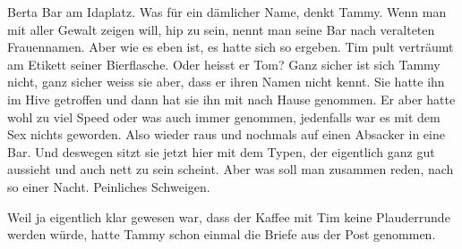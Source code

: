 Berta Bar am Idaplatz. Was für ein dämlicher Name, denkt Tammy. Wenn man mit aller Gewalt zeigen will, hip zu sein, nennt man seine Bar nach veralteten Frauennamen. Aber wie es eben ist, es hatte sich so ergeben. Tim pult verträumt am Etikett seiner Bierflasche. Oder heisst er Tom? Ganz sicher ist sich Tammy nicht, ganz sicher weiss sie aber, dass er ihren Namen nicht kennt. Sie hatte ihn im Hive getroffen und dann hat sie ihn mit nach Hause genommen. Er aber hatte wohl zu viel Speed oder was auch immer genommen, jedenfalls war es mit dem Sex nichts geworden. Also wieder raus und nochmals auf einen Absacker in eine Bar. Und deswegen sitzt sie jetzt hier mit dem Typen, der eigentlich ganz gut aussieht und auch nett zu sein scheint. Aber was soll man zusammen reden, nach so einer Nacht. Peinliches Schweigen. 

Weil ja eigentlich klar gewesen war, dass der Kaffee mit Tim keine Plauderrunde werden würde, hatte Tammy schon einmal die Briefe aus der Post genommen.
